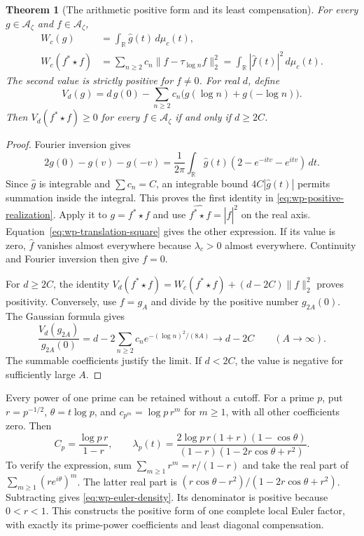 \documentclass[11pt]{article}
\newtheorem{theorem}{Theorem}[section]
\theoremstyle{definition}
\theoremstyle{remark}
\numberwithin{equation}{section}
\newcommand{\cA}{\mathcal A}
\newcommand{\R}{\mathbb R}
\begin{document}
\begin{theorem}[The arithmetic positive form and its least compensation]
\label{thm:wp-positive-form}
For every $g\in\cA_\zeta$ and $f\in\cA_\zeta$,
\begin{equation}
 \begin{aligned}
 W_c(g)&=\int_{\R}\widehat g(t)\,d\mu_c(t),\\
 W_c(f^*\star f)
 &=\sum_{n\geq2}c_n\|f-\tau_{\log n}f\|_2^2
   =\int_{\R}|\widehat f(t)|^2\,d\mu_c(t).
 \end{aligned}
 \label{eq:wp-positive-realization}
\end{equation}
The second value is strictly positive for $f\ne0$.
For real $d$, define
\[
 V_d(g)=d\,g(0)-\sum_{n\geq2}c_n
                         \bigl(g(\log n)+g(-\log n)\bigr).
\]
Then $V_d(f^*\star f)\geq0$ for every $f\in\cA_\zeta$
if and only if $d\geq2C$.
\end{theorem}
\begin{proof}
Fourier inversion gives
\[
 2g(0)-g(v)-g(-v)
 =\frac1{2\pi}\int_{\R}\widehat g(t)(2-e^{-itv}-e^{itv})\,dt.
\]
Since $\widehat g$ is integrable and $\sum c_n=C$, an integrable
bound $4C|\widehat g(t)|$ permits summation inside the integral.
This proves the first identity in \eqref{eq:wp-positive-realization}.
Apply it to $g=f^*\star f$ and use
$\widehat{f^*\star f}=|\widehat f|^2$ on the real axis.
Equation~\eqref{eq:wp-translation-square} gives the other expression.
If its value is zero, $\widehat f$ vanishes almost everywhere because
$\lambda_c>0$ almost everywhere.
Continuity and Fourier inversion then give $f=0$.

For $d\geq2C$, the identity
$V_d(f^*\star f)=W_c(f^*\star f)+(d-2C)\|f\|_2^2$
proves positivity.
Conversely, use $f=g_A$ and divide by the positive number $g_{2A}(0)$.
The Gaussian formula gives
\[
 \frac{V_d(g_{2A})}{g_{2A}(0)}
 =d-2\sum_{n\geq2}c_n e^{-(\log n)^2/(8A)}
 \longrightarrow d-2C\qquad(A\to\infty).
\]
The summable coefficients justify the limit.
If $d<2C$, the value is negative for sufficiently large $A$.
\end{proof}

Every power of one prime can be retained without a cutoff.
For a prime $p$, put $r=p^{-1/2}$, $\theta=t\log p$, and
$c_{p^m}=\log p\,r^m$ for $m\geq1$, with all other coefficients zero.
Then
\begin{equation}
 C_p=\frac{\log p\,r}{1-r},\qquad
 \lambda_p(t)=
 \frac{2\log p\,r(1+r)(1-\cos\theta)}
 {(1-r)(1-2r\cos\theta+r^2)}.
 \label{eq:wp-euler-density}
\end{equation}
To verify the expression, sum $\sum_{m\geq1}r^m=r/(1-r)$ and
take the real part of $\sum_{m\geq1}(re^{i\theta})^m$.
The latter real part is
$(r\cos\theta-r^2)/(1-2r\cos\theta+r^2)$.
Subtracting gives \eqref{eq:wp-euler-density}.
Its denominator is positive because $0<r<1$.
This constructs the positive form of one complete local Euler factor,
with exactly its prime-power coefficients and least diagonal compensation.
\end{document}
